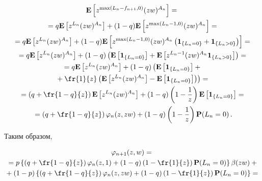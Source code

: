 \begin{multline*}

\mathbf{E}\left[z^{\max(L_n-f_{n+1},0)}(zw)^{A_n}\right]={}\\

{}=

q\mathbf{E}\left[z^{L_n}(zw)^{A_n}\right]+(1-q)\mathbf{E}\left[z^{\max(L_n-1,0)}(zw)^{A_n}\right]={}\\

{}=q\mathbf{E}\left[z^{L_n}(zw)^{A_n}\right]+(1-q)\mathbf{E}\left[z^{\max(L_n-1,0)}(zw)^{A_n}\left(\mathbf{1}_{\{L_n=0\}}+\mathbf{1}_{\{L_n>0\}}\right)\right]={}\\

{}=q\mathbf{E}\left[z^{L_n}(zw)^{A_n}\right]+(1-q)\left(\mathbf{E}\left[\mathbf{1}_{\{L_n=0\}}\right]+\mathbf{E}\left[z^{L_n-1}(zw)^{A_n}\mathbf{1}_{\{L_n>0\}}\right]\right)={}\\

{}=q\mathbf{E}\left[z^{L_n}(zw)^{A_n}\right]+(1-q)\left(

\vphantom{\fr{1}{z}}\mathbf{E}\left[

\mathbf{1}_{\{L_n=0\}}\right]+{}\right.\\

\left.{}+\fr{1}{z}\left(\mathbf{E}\left[z^{L_n}(zw)^{A_n}\right]-

\mathbf{E}\left[\mathbf{1}_{\{L_n=0\}}\right]\right)\right)={}\\

{}=\left(q+\fr{1-q}{z}\right)\mathbf{E}\left[z^{L_n}(zw)^{A_n}\right]+(1-q)\left(1-\frac{1}{z}\right)\mathbf{E}\left[\mathbf{1}_{\{L_n=0\}}\right]={}\\

{}=\left(q+\fr{1-q}{z}\right)\varphi_n(z,zw)+(1-q)\left(1-\frac{1}{z}\right)\mathbf{P}(L_n=0)\,.

\end{multline*}

Таким образом,

\begin{multline*}

\varphi_{n+1}(z,w)={}\\

{}=p\left\{\left(q+\fr{1-q}{z}\right)\varphi_n(z,1)+

(1-q)\left(1-\fr{1}{z}\right)\mathbf{P}(L_n=0)\right\}\beta(zw)+{}\\

{}+(1-p)\left\{\left(q+\fr{1-q}{z}\right)\varphi_n(z,zw)+(1-q)

\left(1-\fr{1}{z}\right)\mathbf{P}(L_n=0)\right\}={}

\end{multline*}



